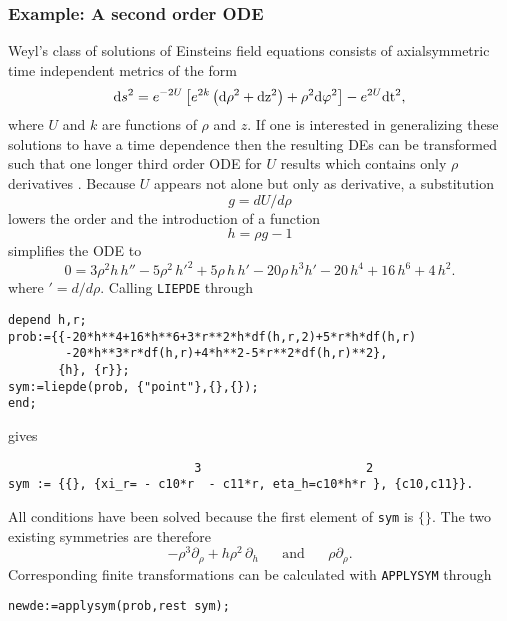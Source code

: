 \subsubsection{Example: A second order ODE}
Weyl's class of solutions of Einsteins field equations consists of
axialsymmetric time independent metrics of the form
\begin{equation}
{\rm{d}} s^2 = e^{-2 U} \left[ e^{2 k}  \left( \rm{d} \rho^2 + \rm{d}
z^2 \right)+\rho^2 \rm{d} \varphi^2 \right] - e^{2 U} \rm{d} t^2,
\end{equation}
where $U$ and $k$ are functions of $\rho$ and $z$. If one is interested in
generalizing these solutions to have a time dependence then the resulting
DEs can be transformed such that one longer third order ODE for $U$ results
which contains only $\rho$ derivatives \cite{Markus}. Because $U$ appears
not alone but only as derivative, a substitution
\begin{equation}
g = dU/d\rho      \label{g1dgl}
\end{equation}
lowers the order and the introduction of a function
\begin{equation}
h = \rho g - 1    \label{g2dgl}
\end{equation}
simplifies the ODE to
\begin{equation}
0 = 3\rho^2h\,h''
-5\rho^2\,h'^2+5\rho\,h\,h'-20\rho\,h^3h'-20\,h^4+16\,h^6+4\,h^2. \label{hdgl}
\end{equation}
where $'= d/d\rho$.
Calling {\tt LIEPDE} through
\small \begin{verbatim}
depend h,r;
prob:={{-20*h**4+16*h**6+3*r**2*h*df(h,r,2)+5*r*h*df(h,r)
        -20*h**3*r*df(h,r)+4*h**2-5*r**2*df(h,r)**2},
       {h}, {r}};
sym:=liepde(prob, {"point"},{},{});
end; \end{verbatim} \normalsize
gives \small \begin{verbatim}
                          3                       2
sym := {{}, {xi_r= - c10*r  - c11*r, eta_h=c10*h*r }, {c10,c11}}.
\end{verbatim} \normalsize
All conditions have been solved because the first element of {\tt sym}
is $\{\}$. The two existing symmetries are therefore
\begin{equation}
  - \rho^3 \partial_{\rho} +  h \rho^2 \,\partial_{h} \;\;\;\;\;\;\mbox{and}
  \;\;\;\;\;\;\rho \partial_{\rho}.
\end{equation}
Corresponding finite
transformations can be calculated with {\tt APPLYSYM} through
\small \begin{verbatim}
newde:=applysym(prob,rest sym);
\end{verbatim} \normalsize
